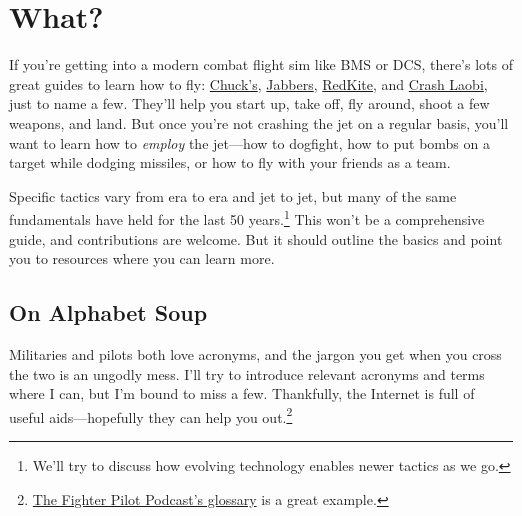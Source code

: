 \chapter{What?}

If you're getting into a modern combat flight sim like BMS or DCS,
there's lots of great guides to learn how to fly:
\href{https://www.mudspike.com/chucks-guides/}{Chuck's},
\href{https://www.youtube.com/channel/UCvXXUrGCF3wV3bbZ6pFQ00g}{Jabbers},
\href{https://www.youtube.com/user/RedKiteRender}{RedKite},
and
\href{https://www.youtube.com/channel/UCqH078Ef0HENo01LF3xwIvA}{Crash Laobi},
just to name a few.
They'll help you start up, take off, fly around, shoot a few weapons, and land.
But once you're not crashing the jet on a regular basis,
you'll want to learn how to \emph{employ} the jet---how to dogfight,
how to put bombs on a target while dodging missiles,
or how to fly with your friends as a team.

Specific tactics vary from era to era and jet to jet,
but many of the same fundamentals have held for the last 50
years.\punckern\footnote{We'll try to discuss how evolving technology
enables newer tactics as we go.}
This won't be a comprehensive guide,
and contributions are welcome.
But it should outline the basics and point you to resources where you can
learn more.

\section{On Alphabet Soup}

Militaries and pilots both love acronyms,
and the jargon you get when you cross the two is an ungodly mess.
I'll try to introduce relevant acronyms and terms where I can,
but I'm bound to miss a few.
Thankfully, the Internet is full of useful aids---hopefully they can help you
out.\punckern\footnote{%
\href{https://www.fighterpilotpodcast.com/glossary/}{The Fighter Pilot Podcast's glossary}
is a great example.}
